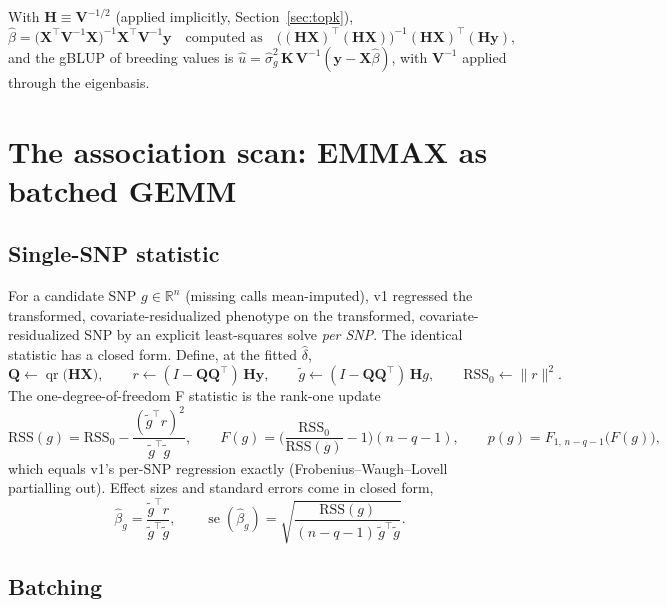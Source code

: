 \documentclass[11pt]{article}
\newcommand{\y}{\mathbf{y}}
\newcommand{\K}{\mathbf{K}}
\newcommand{\X}{\mathbf{X}}
\newcommand{\Q}{\mathbf{Q}}
\newcommand{\V}{\mathbf{V}}
\newcommand{\Hm}{\mathbf{H}}
\newcommand{\R}{\mathbb{R}}
\begin{document}
With $\Hm \equiv \V^{-1/2}$ (applied implicitly, Section~\ref{sec:topk}),
\begin{equation}
  \hat\beta = \big(\X^\top\V^{-1}\X\big)^{-1}\X^\top\V^{-1}\y
  \quad\text{computed as}\quad
  \big((\Hm\X)^\top(\Hm\X)\big)^{-1}(\Hm\X)^\top(\Hm\y),
  \label{eq:gls}
\end{equation}
and the gBLUP of breeding values is
$\hat u = \hat\sigma_g^2\,\K\,\V^{-1}(\y - \X\hat\beta)$, with
$\V^{-1}$ applied through the eigenbasis.

\section{The association scan: EMMAX as batched GEMM}
\label{sec:scan}

\subsection{Single-SNP statistic}

For a candidate SNP $g \in \R^n$ (missing calls mean-imputed), v1
regressed the transformed, covariate-residualized phenotype on the
transformed, covariate-residualized SNP by an explicit least-squares
solve \emph{per SNP}. The identical statistic has a closed form.
Define, at the fitted $\hat\delta$,
\begin{equation}
  \Q \gets \operatorname{qr}\big(\Hm\X\big), \qquad
  r \gets (I - \Q\Q^\top)\,\Hm\y, \qquad
  \tilde g \gets (I - \Q\Q^\top)\,\Hm g, \qquad
  \mathrm{RSS}_0 \gets \|r\|^2 .
\end{equation}
The one-degree-of-freedom F statistic is the rank-one update
\begin{equation}
  \mathrm{RSS}(g) = \mathrm{RSS}_0 - \frac{(\tilde g^\top r)^2}{\tilde g^\top\tilde g},
  \qquad
  F(g) = \Big(\frac{\mathrm{RSS}_0}{\mathrm{RSS}(g)} - 1\Big)(n - q - 1),
  \qquad
  p(g) = F_{1,\,n-q-1}\big(F(g)\big),
  \label{eq:scanstat}
\end{equation}
which equals v1's per-SNP regression exactly (Frobenius--Waugh--Lovell
partialling out). Effect sizes and standard errors come in closed form,
\begin{equation}
  \hat\beta_g = \frac{\tilde g^\top r}{\tilde g^\top \tilde g},
  \qquad
  \operatorname{se}(\hat\beta_g) =
  \sqrt{\frac{\mathrm{RSS}(g)}{(n - q - 1)\,\tilde g^\top\tilde g}} .
\end{equation}

\subsection{Batching}
\end{document}
